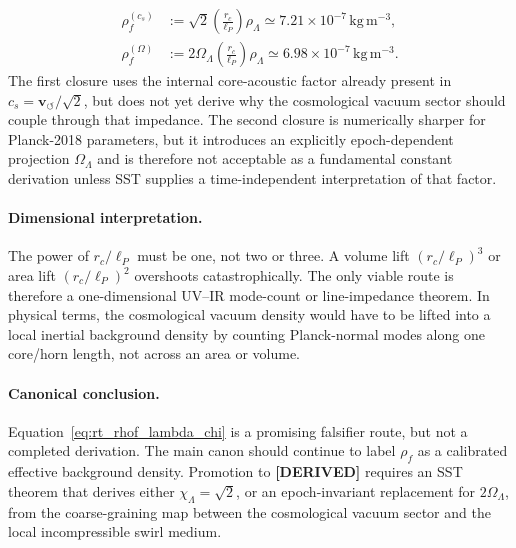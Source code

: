 \begin{align}
    \rho_{\!f}^{(c_s)}
    &:=
    \sqrt{2}
    \left(\frac{r_c}{\ell_P}\right)
    \rho_\Lambda
    \simeq
    7.21\times10^{-7}\,\mathrm{kg\,m^{-3}},
    \\
    \rho_{\!f}^{(\Omega)}
    &:=
    2\Omega_\Lambda
    \left(\frac{r_c}{\ell_P}\right)
    \rho_\Lambda
    \simeq
    6.98\times10^{-7}\,\mathrm{kg\,m^{-3}} .
\end{align}
The first closure uses the internal core-acoustic factor already present in
\(c_s=\mathbf{v}_{\!\boldsymbol{\circlearrowleft}}/\sqrt{2}\), but does not yet
derive why the cosmological vacuum sector should couple through that
impedance. The second closure is numerically sharper for Planck-2018
parameters, but it introduces an explicitly epoch-dependent projection
\(\Omega_\Lambda\) and is therefore not acceptable as a fundamental
constant derivation unless SST supplies a time-independent interpretation of
that factor.

\paragraph{Dimensional interpretation.}
The power of \(r_c/\ell_P\) must be one, not two or three. A volume lift
\((r_c/\ell_P)^3\) or area lift \((r_c/\ell_P)^2\) overshoots catastrophically.
The only viable route is therefore a one-dimensional UV--IR mode-count or
line-impedance theorem. In physical terms, the cosmological vacuum density
would have to be lifted into a local inertial background density by counting
Planck-normal modes along one core/horn length, not across an area or volume.

\paragraph{Canonical conclusion.}
Equation~\eqref{eq:rt_rhof_lambda_chi} is a promising falsifier route, but
not a completed derivation. The main canon should continue to label
\(\rho_{\!f}\) as a calibrated effective background density. Promotion to
\textbf{[DERIVED]} requires an SST theorem that derives either
\(\chi_\Lambda=\sqrt{2}\), or an epoch-invariant replacement for
\(2\Omega_\Lambda\), from the coarse-graining map between the cosmological
vacuum sector and the local incompressible swirl medium.
